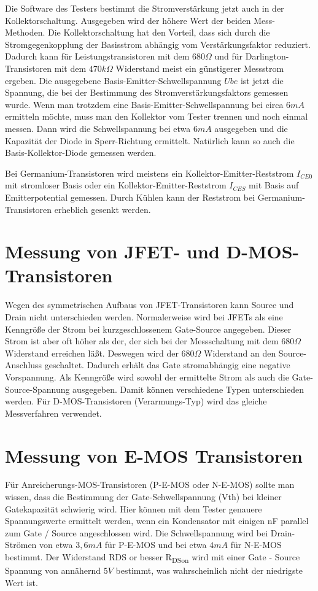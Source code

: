 Die Software des Testers bestimmt die Stromverstärkung jetzt auch in der Kollektorschaltung.
Ausgegeben wird der höhere Wert der beiden Mess-Methoden.
Die Kollektorschaltung hat den Vorteil, dass sich durch die Stromgegenkopplung der Basisstrom abhängig vom
Verstärkungsfaktor reduziert. Dadurch kann für Leistungstransistoren mit dem \(680\Omega\) und für Darlington-Transistoren
mit dem \(470k\Omega\) Widerstand meist ein günstigerer Messstrom ergeben.
Die ausgegebene Basis-Emitter-Schwellspannung \(Ube\) ist jetzt die Spannung,
die bei der Bestimmung des Stromverstärkungsfaktors gemessen wurde.
Wenn man trotzdem eine Basis-Emitter-Schwellspannung bei circa \(6mA\) ermitteln möchte, muss man den Kollektor
vom Tester trennen und noch einmal messen.
Dann wird die Schwellspannung bei etwa \(6mA\) ausgegeben und die Kapazität der Diode in Sperr-Richtung ermittelt.
Natürlich kann so auch die Basis-Kollektor-Diode gemessen werden.

Bei Germanium-Transistoren wird meistens ein Kollektor-Emitter-Reststrom \(I_{CE0}\) mit stromloser Basis oder
ein Kollektor-Emitter-Reststrom \(I_{CES}\) mit Basis auf Emitterpotential gemessen.
Durch Kühlen kann der Reststrom bei Germanium-Transistoren erheblich gesenkt werden. 

\section{Messung von JFET- und D-MOS-Transistoren}
Wegen des symmetrischen Aufbaus von JFET-Transistoren kann Source und Drain nicht unterschieden werden.
Normalerweise wird bei JFETs als eine Kenngröße der Strom bei kurzgeschlossenem Gate-Source angegeben.
Dieser Strom ist aber oft höher als der, der sich bei der Messschaltung mit dem \(680\Omega\) Widerstand erreichen läßt.
Deswegen wird der \(680\Omega\) Widerstand an den Source-Anschluss geschaltet. Dadurch erhält das Gate
stromabhängig eine negative Vorspannung. Als Kenngröße wird sowohl der ermittelte Strom als auch die
Gate-Source-Spannung ausgegeben. 
Damit können verschiedene Typen unterschieden werden.
Für D-MOS-Transistoren (Verarmungs-Typ) wird das gleiche Messverfahren verwendet.

\section{Messung von E-MOS Transistoren}
Für Anreicherungs-MOS-Transistoren (P-E-MOS oder N-E-MOS) sollte man wissen, dass die Bestimmung der Gate-Schwellspannung (Vth)
bei kleiner Gatekapazität schwierig wird. Hier können mit dem Tester genauere Spannungswerte ermittelt werden, wenn ein
Kondensator mit einigen nF parallel zum Gate / Source angeschlossen wird.
Die Schwellspannung wird bei Drain-Strömen von etwa \(3,6mA\) für P-E-MOS und bei etwa \(4mA\) für N-E-MOS bestimmt.
Der Widerstand RDS or besser R\textsubscript{DSon} wird mit einer Gate - Source Spannung von annähernd \(5V\) bestimmt,
 was wahrscheinlich nicht der niedrigste Wert ist.

